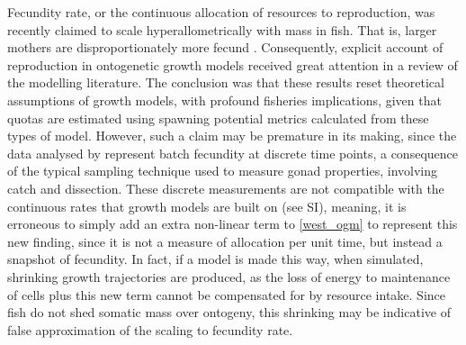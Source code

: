\documentclass[a4paper]{article} %
\begin{document}
    Fecundity rate, or the continuous allocation of resources to reproduction, was recently claimed to scale hyperallometrically with mass in fish. That is, larger mothers are disproportionately more fecund \autocite{Barneche2018d}. Consequently, explicit account of reproduction in ontogenetic growth models received great attention in a review of the modelling literature\autocite{Marshall2019b}. The conclusion was that these results reset theoretical assumptions of growth models, with profound fisheries implications, given that quotas are estimated using spawning potential metrics calculated from these types of model. However, such a claim may be premature in its making, since the data analysed by \cite{Barneche2018d} represent batch fecundity at discrete time points, a consequence of the typical sampling technique used to measure gonad properties, involving catch and dissection. These discrete measurements are not compatible with the continuous rates that growth models are built on (see SI), meaning, it is erroneous to simply add an extra non-linear term to \cref{west_ogm} to represent this new finding, since it is not a measure of allocation per unit time, but instead a snapshot of fecundity. In fact, if a model is made this way, when simulated, shrinking growth trajectories are produced, as the loss of energy to maintenance of cells plus this new term cannot be compensated for by resource intake. Since fish do not shed somatic mass over ontogeny, this shrinking may be indicative of false approximation of the scaling to fecundity rate.
\end{document}
